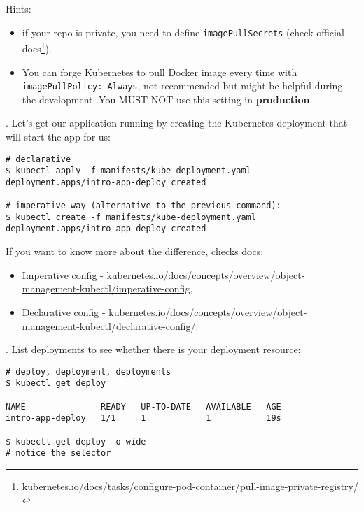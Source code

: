 \documentclass[12pt, letterpaper]{article}
\begin{document}
\smallskip
Hints:
\begin{itemize}
\item if your repo is private, you need to define \verb|imagePullSecrets| (check official docs\footnote{\href{https://kubernetes.io/docs/tasks/configure-pod-container/pull-image-private-registry/}{kubernetes.io/docs/tasks/configure-pod-container/pull-image-private-registry/}}).
\item You can forge Kubernetes to pull Docker image every time with\\ \verb|imagePullPolicy: Always|, not recommended but might be helpful during the development. You MUST NOT use this setting in \textbf{production}.
\end{itemize}

. Let's get our application running by creating the Kubernetes deployment that will start the app for us:

\begin{verbatim}
# declarative
$ kubectl apply -f manifests/kube-deployment.yaml
deployment.apps/intro-app-deploy created

# imperative way (alternative to the previous command):
$ kubectl create -f manifests/kube-deployment.yaml
deployment.apps/intro-app-deploy created
\end{verbatim}

If you want to know more about the difference, checks docs:\begin{itemize}
\item Imperative config - \href{https://kubernetes.io/docs/concepts/overview/object-management-kubectl/imperative-config/}{kubernetes.io/docs/concepts/overview/object-management-kubectl/imperative-config},
\item Declarative config - \href{https://kubernetes.io/docs/concepts/overview/object-management-kubectl/declarative-config/}{kubernetes.io/docs/concepts/overview/object-management-kubectl/declarative-config/}.
\end{itemize}

. List deployments to see whether there is your deployment resource:

\begin{verbatim}
# deploy, deployment, deployments
$ kubectl get deploy

NAME               READY   UP-TO-DATE   AVAILABLE   AGE
intro-app-deploy   1/1     1            1           19s

$ kubectl get deploy -o wide
# notice the selector

\end{verbatim}
\end{document}
